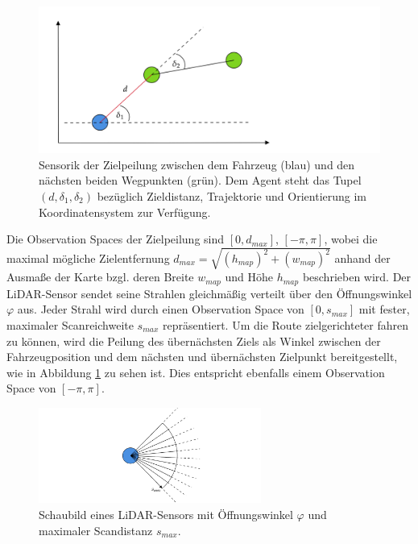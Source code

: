 \begin{figure}[h]
  \centering
  \includegraphics[width = 1.0\textwidth]{imgs/goal_sensor}
  \caption{Sensorik der Zielpeilung zwischen dem Fahrzeug (blau) und den nächsten beiden
  Wegpunkten (grün).   Dem Agent steht das Tupel $(d, \delta_1, \delta_2)$ bezüglich Zieldistanz,
  Trajektorie und Orientierung im Koordinatensystem zur Verfügung.}
  \label{fig:goal_sensor}
\end{figure}

Die Observation Spaces der Zielpeilung sind $[0, d_{max}]$, $[-\pi, \pi]$, wobei die maximal
mögliche Zielentfernung $d_{max} = \sqrt{(h_{map})^2 + (w_{map})^2}$ anhand der Ausmaße der
Karte bzgl. deren Breite $w_{map}$ und Höhe $h_{map}$ beschrieben wird. Der LiDAR-Sensor sendet
seine Strahlen gleichmäßig verteilt über den Öffnungswinkel $\varphi$ aus. Jeder Strahl wird
durch einen Observation Space von $[0, s_{max}]$ mit fester, maximaler Scanreichweite $s_{max}$
repräsentiert. Um die Route zielgerichteter fahren zu können, wird die Peilung des übernächsten
Ziels als Winkel zwischen der Fahrzeugposition und dem nächsten und übernächsten Zielpunkt
bereitgestellt, wie in Abbildung \ref{fig:goal_sensor} zu sehen ist. Dies entspricht
ebenfalls einem Observation Space von $[-\pi, \pi]$.\\

\begin{figure}[h]
  \centering
  \includegraphics[width = 0.65\textwidth]{imgs/lidar_sensor}
  \caption{Schaubild eines LiDAR-Sensors mit Öffnungswinkel $\varphi$  und maximaler Scandistanz $s_{max}$.}
  \label{fig:linseg_circle_intersect}
\end{figure}

